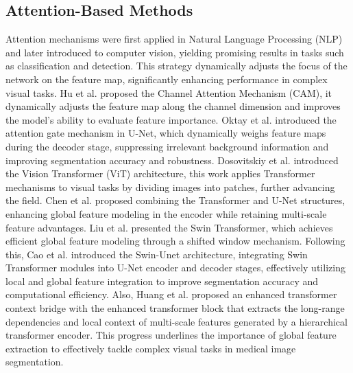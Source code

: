 \documentclass[sn-mathphys-num]{sn-jnl}
\theoremstyle{thmstyleone}%
\theoremstyle{thmstyletwo}%
\theoremstyle{thmstylethree}%
\begin{document}
\subsection{Attention-Based Methods}
Attention mechanisms were first applied in Natural Language Processing (NLP) and later introduced to computer vision, yielding promising results in tasks such as classification and detection.
This strategy dynamically adjusts the focus of the network on the feature map, significantly enhancing performance in complex visual tasks\cite{chen2019multi}.
Hu et al. \cite{hu2018squeeze} proposed the Channel Attention Mechanism (CAM), it dynamically adjusts the feature map along the channel dimension and improves the model's ability to evaluate feature importance.
Oktay et al. \cite{oktay2018attention} introduced the attention gate mechanism in U-Net, which dynamically weighs feature maps during the decoder stage, suppressing irrelevant background information and improving segmentation accuracy and robustness.
Dosovitskiy et al. \cite{dosovitskiy2020image} introduced the Vision Transformer (ViT) architecture, this work applies Transformer mechanisms to visual tasks by dividing images into patches, further advancing the field.
Chen et al. \cite{chen2021transunet} proposed combining the Transformer and U-Net structures, enhancing global feature modeling in the encoder while retaining multi-scale feature advantages.
Liu et al. \cite{liu2021swin} presented the Swin Transformer, which achieves efficient global feature modeling through a shifted window mechanism. 
Following this, Cao et al. \cite{cao2022swin} introduced the Swin-Unet architecture, integrating Swin Transformer modules into U-Net encoder and decoder stages, effectively utilizing local and global feature integration to improve segmentation accuracy and computational efficiency.
Also, Huang et al. \cite{huang2022missformer} proposed an enhanced transformer context bridge with the enhanced transformer block that extracts the long-range dependencies and local context of multi-scale features generated by a hierarchical transformer encoder.
This progress underlines the importance of global feature extraction to effectively tackle complex visual tasks in medical image segmentation.
\end{document}
